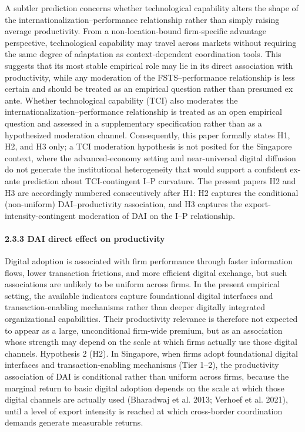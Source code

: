 \documentclass[12pt,a4paper]{article}
\begin{document}
A subtler prediction concerns whether technological capability alters
the shape of the internationalization--performance relationship rather
than simply raising average productivity. From a non-location-bound
firm-specific advantage perspective, technological capability may travel
across markets without requiring the same degree of adaptation as
context-dependent coordination tools. This suggests that its most stable
empirical role may lie in its direct association with productivity,
while any moderation of the FSTS--performance relationship is less
certain and should be treated as an empirical question rather than
presumed ex ante. Whether technological capability (TCI) also moderates
the internationalization--performance relationship is treated as an open
empirical question and assessed in a supplementary specification rather
than as a hypothesized moderation channel. Consequently, this paper
formally states H1, H2, and H3 only; a TCI moderation hypothesis is not
posited for the Singapore context, where the advanced-economy setting
and near-universal digital diffusion do not generate the institutional
heterogeneity that would support a confident ex-ante prediction about
TCI-contingent I--P curvature. The present paper\textquotesingle s H2
and H3 are accordingly numbered consecutively after H1: H2 captures the
conditional (non-uniform) DAI--productivity association, and H3 captures
the export-intensity-contingent moderation of DAI on the I--P
relationship.

\hypertarget{233-dai-direct-effect-on-productivity}{%
\paragraph{2.3.3 DAI direct effect on
productivity}\label{233-dai-direct-effect-on-productivity}}

Digital adoption is associated with firm performance through faster
information flows, lower transaction frictions, and more efficient
digital exchange, but such associations are unlikely to be uniform
across firms. In the present empirical setting, the available indicators
capture foundational digital interfaces and transaction-enabling
mechanisms rather than deeper digitally integrated organizational
capabilities. Their productivity relevance is therefore not expected to
appear as a large, unconditional firm-wide premium, but as an
association whose strength may depend on the scale at which firms
actually use those digital channels. Hypothesis 2 (H2). In Singapore,
when firms adopt foundational digital interfaces and
transaction-enabling mechanisms (Tier 1--2), the productivity
association of DAI is conditional rather than uniform across firms,
because the marginal return to basic digital adoption depends on the
scale at which those digital channels are actually used (Bharadwaj et
al. 2013; Verhoef et al. 2021), until a level of export intensity is
reached at which cross-border coordination demands generate measurable
returns.
\end{document}
